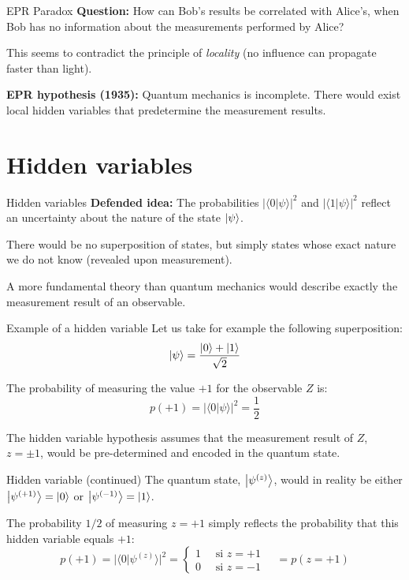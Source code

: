 \documentclass[aspectratio=169,12pt]{beamer}
\begin{document}
\begin{frame}{EPR Paradox}
  \textbf{Question:} How can Bob's results be correlated with Alice's, when Bob has no information about the measurements performed by Alice?
  
  \bigskip
  This seems to contradict the principle of \textit{locality} (no influence can propagate faster than light).

  \bigskip
  \textbf{EPR hypothesis (1935):} Quantum mechanics is incomplete. There would exist local hidden variables that predetermine the measurement results.
\end{frame}

\section{Hidden variables}

\begin{frame}{Hidden variables}
  \textbf{Defended idea:} The probabilities $|\langle 0 | \psi \rangle|^2$ and $|\langle 1 | \psi \rangle|^2$ reflect an uncertainty about the nature of the state $\ket\psi$.
  
  \bigskip
  There would be no superposition of states, but simply states whose exact nature we do not know (revealed upon measurement).
  
  \bigskip
  A more fundamental theory than quantum mechanics would describe exactly the measurement result of an observable.
\end{frame}

\begin{frame}{Example of a hidden variable}
  Let us take for example the following superposition:
  \[
    \ket\psi = \frac{\ket 0 + \ket 1}{\sqrt{2}}
  \]
  
  The probability of measuring the value $+1$ for the observable $Z$ is:
  \[
    p(+1) = |\langle 0 | \psi \rangle|^2 = \frac 12
  \]
  
  The hidden variable hypothesis assumes that the measurement result of $Z$, $z = \pm 1$, would be pre-determined and encoded in the quantum state.
\end{frame}

\begin{frame}{Hidden variable (continued)}
  The quantum state, $\ket{\psi^{(z)}}$, would in reality be either $\ket{\psi^{(+1)}} = \ket 0$ or $\ket{\psi^{(-1)}} = \ket 1$.
  
  \bigskip
  The probability $1/2$ of measuring $z=+1$ simply reflects the probability that this hidden variable equals $+1$:
  \[
    p(+1) = |\langle 0 | \psi^{(z)} \rangle|^2 = 
    \begin{cases}
        1 \quad \text{ si } z=+1 \\
        0 \quad \text{ si } z=-1
    \end{cases}
    \quad
    = p(z=+1)
  \]
\end{frame}
\end{document}
